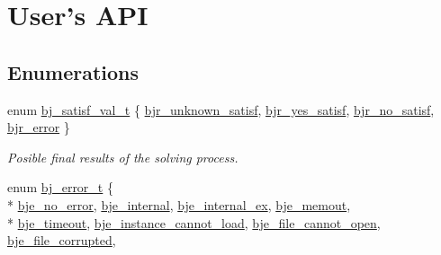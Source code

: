 \hypertarget{group__docgrp___a_p_i}{\section{User's A\+P\+I}
\label{group__docgrp___a_p_i}
}
\subsection*{Enumerations}
\begin{DoxyCompactItemize}
\item 
enum \hyperlink{group__docgrp___a_p_i_ga9aba221730ab694a549d25ee1aa28c69}{bj\+\_\+satisf\+\_\+val\+\_\+t} \{ \hyperlink{group__docgrp___a_p_i_ga9aba221730ab694a549d25ee1aa28c69ad8dafe2640a5e989a73880526a853663}{bjr\+\_\+unknown\+\_\+satisf}, 
\hyperlink{group__docgrp___a_p_i_ga9aba221730ab694a549d25ee1aa28c69af4c1851202dc8838008241c2a527a069}{bjr\+\_\+yes\+\_\+satisf}, 
\hyperlink{group__docgrp___a_p_i_ga9aba221730ab694a549d25ee1aa28c69adc2a37bfd4482eb5167ebb9d47245e8b}{bjr\+\_\+no\+\_\+satisf}, 
\hyperlink{group__docgrp___a_p_i_ga9aba221730ab694a549d25ee1aa28c69a5cee678e06286f3dd31c2f8d60e88979}{bjr\+\_\+error}
 \}
\begin{DoxyCompactList}\small\item\em Posible final results of the solving process. \end{DoxyCompactList}\item 
enum \hyperlink{group__docgrp___a_p_i_ga92a0ce4b68a949f501a3b1d4fb1ded8b}{bj\+\_\+error\+\_\+t} \{ \\*
\hyperlink{group__docgrp___a_p_i_ga92a0ce4b68a949f501a3b1d4fb1ded8ba10f68d8ecd46425c1309870f0fc4b985}{bje\+\_\+no\+\_\+error}, 
\hyperlink{group__docgrp___a_p_i_ga92a0ce4b68a949f501a3b1d4fb1ded8ba26058e34768efeb556c9d0302cd16c50}{bje\+\_\+internal}, 
\hyperlink{group__docgrp___a_p_i_ga92a0ce4b68a949f501a3b1d4fb1ded8baf3e4c46547df8cc20b0c981091b319db}{bje\+\_\+internal\+\_\+ex}, 
\hyperlink{group__docgrp___a_p_i_ga92a0ce4b68a949f501a3b1d4fb1ded8bac46ec7727aca5600957ca9f439bd69de}{bje\+\_\+memout}, 
\\*
\hyperlink{group__docgrp___a_p_i_ga92a0ce4b68a949f501a3b1d4fb1ded8ba6fa8dc875d3850aa4c65d42a83dd60d0}{bje\+\_\+timeout}, 
\hyperlink{group__docgrp___a_p_i_ga92a0ce4b68a949f501a3b1d4fb1ded8ba4914924683de4dbb6c2941193bf5d646}{bje\+\_\+instance\+\_\+cannot\+\_\+load}, 
\hyperlink{group__docgrp___a_p_i_ga92a0ce4b68a949f501a3b1d4fb1ded8ba1fc1eead7cc2a1fc65faea6832d64185}{bje\+\_\+file\+\_\+cannot\+\_\+open}, 
\hyperlink{group__docgrp___a_p_i_ga92a0ce4b68a949f501a3b1d4fb1ded8ba7674cdd84494bdac1309e64f34f5fd0b}{bje\+\_\+file\+\_\+corrupted}, 

\end{DoxyCompactItemize}
